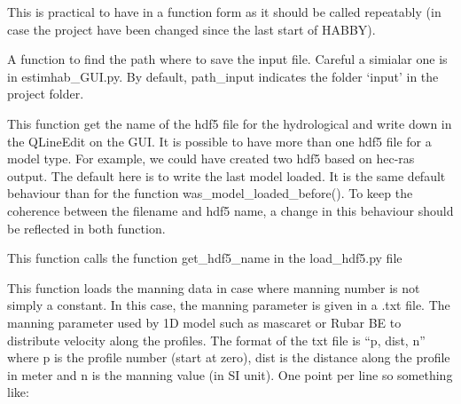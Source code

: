 \documentclass[letterpaper,10pt,english]{sphinxmanual}
\begin{document}
\begin{fulllineitems}
\begin{fulllineitems}
This is practical to have in a function form as it should be called repeatably (in case the project have been
changed since the last start of HABBY).

\end{fulllineitems}


\begin{fulllineitems}
\label{\detokenize{index:src_GUI.hydro_GUI_2.SubHydroW.find_path_input}}
A function to find the path where to save the input file. Careful a simialar one is in estimhab\_GUI.py. By default,
path\_input indicates the folder `input' in the project folder.

\end{fulllineitems}


\begin{fulllineitems}
\label{\detokenize{index:src_GUI.hydro_GUI_2.SubHydroW.gethdf5_name_gui}}
This function get the name of the hdf5 file for the hydrological and write down in the QLineEdit on the GUI.
It is possible to have more than one hdf5 file for a model type. For example, we could have created two hdf5
based on hec-ras output. The default here is to write the last model loaded. It is the same default behaviour
than for the function was\_model\_loaded\_before(). To keep the coherence between the filename and hdf5 name,
a change in this behaviour should be reflected in both function.

This function calls the function get\_hdf5\_name in the load\_hdf5.py file

\end{fulllineitems}


\begin{fulllineitems}
\label{\detokenize{index:src_GUI.hydro_GUI_2.SubHydroW.load_manning_text}}
This function loads the manning data in case where manning number is not simply a constant. In this case, the manning
parameter is given in a .txt file.
The manning parameter used by 1D model such as mascaret or Rubar BE to distribute velocity along the profiles.
The format of the txt file is ``p, dist, n'' where  p is the profile number (start at zero), dist is the distance
along the profile in meter and n is the manning value (in SI unit). One point per line so something like:


\end{fulllineitems}
\end{fulllineitems}
\end{document}
